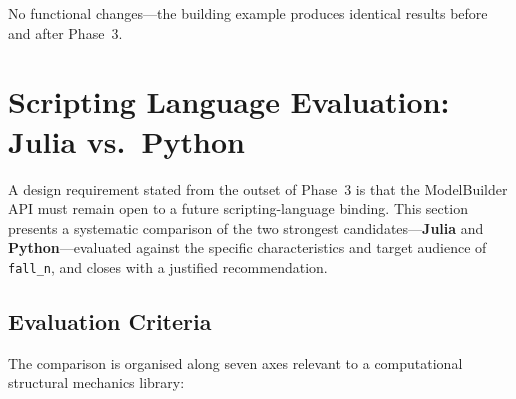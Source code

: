 No functional changes---the building example produces identical
results before and after Phase~3.


\section{Scripting Language Evaluation: Julia vs.\ Python}
\label{sec:scripting-evaluation}

A design requirement stated from the outset of Phase~3 is that the
ModelBuilder API must remain open to a future scripting-language
binding.  This section presents a systematic comparison of the two
strongest candidates---\textbf{Julia} and \textbf{Python}---evaluated
against the specific characteristics and target audience of
\texttt{fall\_n}, and closes with a justified recommendation.

\subsection{Evaluation Criteria}
\label{sec:scripting-criteria}

The comparison is organised along seven axes relevant to a
computational structural mechanics library:

